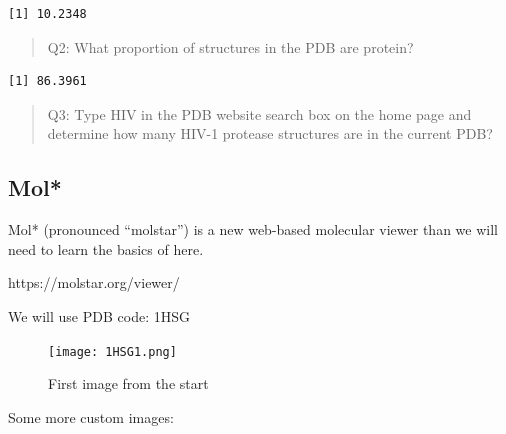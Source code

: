 \documentclass[
  letterpaper,
  DIV=11,
  numbers=noendperiod]{scrartcl}
\newenvironment{Shaded}{\begin{snugshade}}{\end{snugshade}}
\newcommand{\DecValTok}[1]{\textcolor[rgb]{0.68,0.00,0.00}{#1}}
\newcommand{\FunctionTok}[1]{\textcolor[rgb]{0.28,0.35,0.67}{#1}}
\newcommand{\NormalTok}[1]{\textcolor[rgb]{0.00,0.23,0.31}{#1}}
\newcommand{\SpecialCharTok}[1]{\textcolor[rgb]{0.37,0.37,0.37}{#1}}
\begin{document}
\begin{verbatim}
[1] 10.2348
\end{verbatim}

\begin{quote}
Q2: What proportion of structures in the PDB are protein?
\end{quote}

\begin{Shaded}
\end{Shaded}

\begin{verbatim}
[1] 86.3961
\end{verbatim}

\begin{quote}
Q3: Type HIV in the PDB website search box on the home page and
determine how many HIV-1 protease structures are in the current PDB?
\end{quote}

\subsection{Mol*}\label{mol}

Mol* (pronounced ``molstar'') is a new web-based molecular viewer than
we will need to learn the basics of here.

https://molstar.org/viewer/

We will use PDB code: 1HSG

\begin{figure}[H]

{\centering \texttt{[image: 1HSG1.png]}

}

\caption{First image from the start}

\end{figure}%

Some more custom images:
\end{document}
